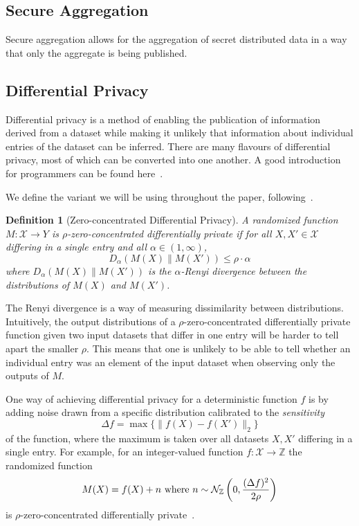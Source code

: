 \documentclass{article}
\newtheorem{definition}{Definition}
\begin{document}
\subsection{Secure Aggregation}
Secure aggregation allows for the aggregation of secret distributed data in a
way that only the aggregate is being published. 


\subsection{Differential Privacy}
Differential privacy is a method of enabling the publication of information derived from a dataset while making it unlikely that information about individual entries of the dataset can be inferred. There are many flavours of differential privacy, most of which can be converted into one another. A good introduction for programmers can be found here~\cite{near_abuah_2021}.

We define the variant we will be using throughout the paper, following~\cite{DBLP:journals/corr/BunS16}.
\begin{definition}[Zero-concentrated Differential Privacy]
A randomized function $M: \mathcal X\rightarrow Y$ is $\rho$-zero-concentrated differentially private if for all $X,X'\in \mathcal X$ differing in a single entry and all $\alpha\in(1,\infty)$,
$$D_\alpha(M(X)\|M(X'))\leq \rho\cdot\alpha$$
where $D_\alpha(M(X)\|M(X'))$ is the $\alpha$-Renyi divergence between the distributions of $M(X)$ and $M(X')$.
\end{definition}

The Renyi divergence is a way of measuring dissimilarity between distributions. Intuitively, the output distributions of a $\rho$-zero-concentrated differentially private function given two input datasets that differ in one entry will be harder to tell apart the smaller $\rho$. This means that one is unlikely to be able to tell whether an individual entry was an element of the input dataset when observing only the outputs of $M$.

One way of achieving differential privacy for a deterministic function $f$ is by adding noise drawn from a specific distribution calibrated to the \textit{sensitivity} 
$$\Delta f=\max\{\|f(X)-f(X')\|_2\}$$
of the function, where the maximum is taken over all datasets $X,X'$ differing in a single entry. For example, for an integer-valued function $f:\mathcal X\rightarrow \mathbb Z$ the randomized function
$$M(X) = f(X) + n \textnormal{ where } n \sim \mathcal N_\mathbb{Z}\left(0,\frac{(\Delta f)^2}{2\rho}\right)$$
is $\rho$-zero-concentrated differentially private~\cite[Proposition 1.6]{DBLP:journals/corr/abs-2004-00010}.
\end{document}
